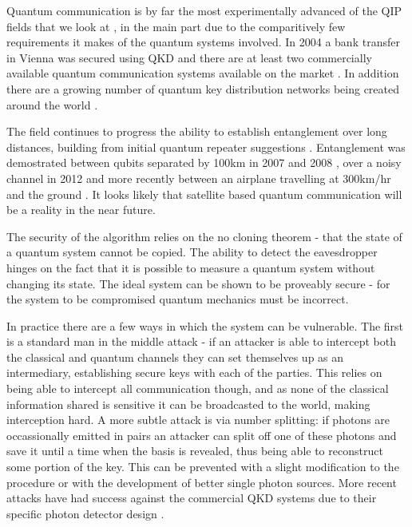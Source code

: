 Quantum communication is by far the most experimentally advanced of the QIP fields that we look at \cite{quantum_crypt_review}, in the main part due to the comparitively few requirements it makes of the quantum systems involved. In 2004 a bank transfer in Vienna was secured using QKD \cite{qkd_bank_transfer_04} and there are at least two commercially available quantum communication systems available on the market \cite{idquant_qkd_system, magiq_qkd_system}. In addition there are a growing number of quantum key distribution networks being created around the world \cite{secoqc_network, tokyo_qkd_network}.

The field continues to progress the ability to establish entanglement over long distances, building from initial quantum repeater suggestions \cite{quantum_repeaters}. Entanglement was demostrated between qubits separated by 100km in 2007 and 2008 \cite{entanglement_97km_08, entanglement_144km_07}, over a noisy channel in 2012 \cite{qkd_noisy_channel_12} and more recently between an airplane travelling at 300km/hr and the ground \cite{qkd_airbourne_13}. It looks likely that satellite based quantum communication will be a reality in the near future.


The security of the algorithm relies on the no cloning theorem \cite{no_cloning} - that the state of a quantum system cannot be copied. The ability to detect the eavesdropper hinges on the fact that it is possible to measure a quantum system without changing its state. The ideal system can be shown to be proveably secure - for the system to be compromised quantum mechanics must be incorrect.

In practice there are a few ways in which the system can be vulnerable. The first is a standard man in the middle attack - if an attacker is able to intercept both the classical and quantum channels they can set themselves up as an intermediary, establishing secure keys with each of the parties. This relies on being able to intercept all communication though, and as none of the classical information shared is sensitive it can be broadcasted to the world, making interception hard. A more subtle attack is via number splitting\cite{qkd_number_splitting_attacks_00}: if photons are occassionally emitted in pairs an attacker can split off one of these photons and save it until a time when the basis is revealed, thus being able to reconstruct some portion of the key. This can be prevented with a slight modification to the procedure \cite{qkd_decoy_defense} or with the development of better single photon sources. More recent attacks have had success against the commercial QKD systems due to their specific photon detector design \cite{qkd_blinding_attack}.


